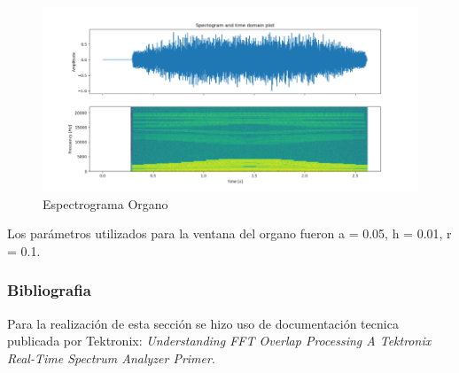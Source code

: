 \begin{figure}[H]
	\centering
	\includegraphics[width=0.7\linewidth]{ImagenesEjercicio7/EspectogramaOrganoEscala}
	\caption{Espectrograma Organo}
	\label{fig:espectogramaorganoescala}
\end{figure}
Los parámetros utilizados para la ventana del organo fueron
a = 0.05, h = 0.01, r = 0.1.
\subsubsection{Bibliografia}
Para la realización de esta sección se hizo uso de documentación tecnica publicada por Tektronix: \textit{Understanding FFT Overlap Processing
A Tektronix Real-Time Spectrum Analyzer Primer}.